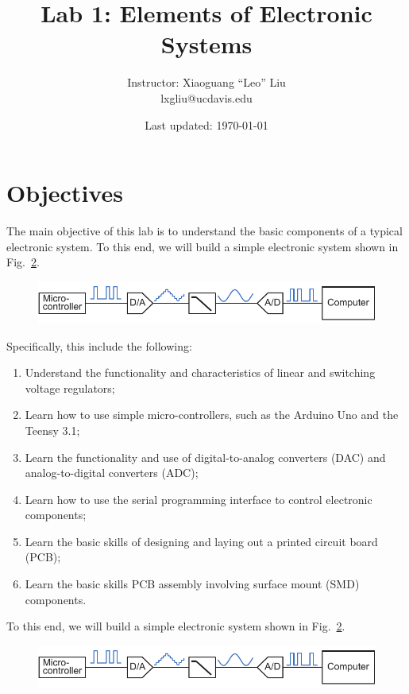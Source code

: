 \documentclass[letterpaper, 11pt]{article}
\begin{document}
\title{Lab 1: Elements of Electronic Systems}
\author{Instructor: Xiaoguang ``Leo'' Liu\\lxgliu@ucdavis.edu}
\date{Last updated: \today}

\maketitle

\section{Objectives}
The main objective of this lab is to understand the basic components of a typical electronic system. To this end, we will build a simple electronic system shown in Fig.~\ref{fig:lab1-system}. 

\begin{figure}[h]
	\centering
	\includegraphics{lab1-system}
	\caption{}
	\label{fig:lab1-system}
\end{figure}

Specifically, this include the following:
\begin{enumerate}
\item Understand the functionality and characteristics of linear and switching voltage regulators;
\item Learn how to use simple micro-controllers, such as the Arduino Uno and the Teensy 3.1;
\item Learn the functionality and use of digital-to-analog converters (DAC) and analog-to-digital converters (ADC);
\item Learn how to use the serial programming interface to control electronic components;
\item Learn the basic skills of designing and laying out a printed circuit board (PCB);
\item Learn the basic skills PCB assembly involving surface mount (SMD) components.
\end{enumerate}

To this end, we will build a simple electronic system shown in Fig.~\ref{fig:lab1-system}. 

\begin{figure}[h]
	\centering
	\includegraphics{lab1-system}
	\caption{}
	\label{fig:lab1-system}
\end{figure}
\end{document}
